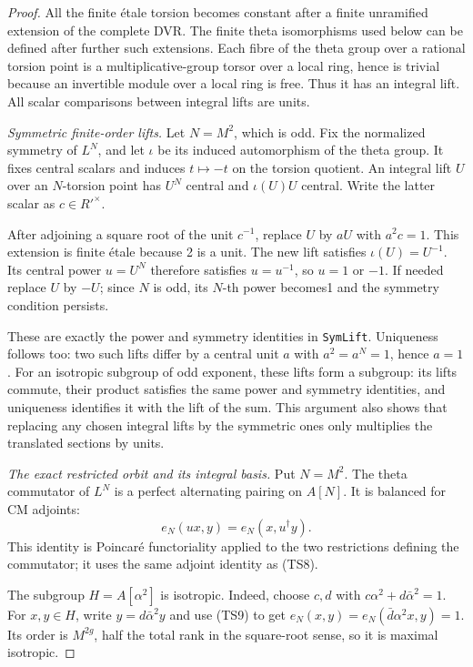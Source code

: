 \documentclass[11pt,a4paper]{article}
\theoremstyle{definition}\newtheorem{remark}[theorem]{Remark}
\begin{document}
\begin{proof}
All the finite étale torsion becomes constant after a finite unramified extension of the complete DVR. The finite theta isomorphisms used below can be defined after further such extensions. Each fibre of the theta group over a rational torsion point is a multiplicative-group torsor over a local ring, hence is trivial because an invertible module over a local ring is free. Thus it has an integral lift. All scalar comparisons between integral lifts are units.

\emph{Symmetric finite-order lifts.}
Let \(N=M^2\), which is odd. Fix the normalized symmetry of \(L^N\), and let \(\iota\) be its induced automorphism of the theta group. It fixes central scalars and induces \(t\mapsto-t\) on the torsion quotient. An integral lift \(U\) over an \(N\)-torsion point has \(U^N\) central and \(\iota(U)U\) central. Write the latter scalar as \(c\in R'^\times\).

After adjoining a square root of the unit \(c^{-1}\), replace \(U\) by \(aU\) with \(a^2c=1\). This extension is finite étale because 2 is a unit. The new lift satisfies \(\iota(U)=U^{-1}\). Its central power \(u=U^N\) therefore satisfies \(u=u^{-1}\), so \(u=1\) or \(-1\). If needed replace \(U\) by \(-U\); since \(N\) is odd, its \(N\)-th power becomes1 and the symmetry condition persists.

These are exactly the power and symmetry identities in \texttt{SymLift}. Uniqueness follows too: two such lifts differ by a central unit \(a\) with \(a^2=a^N=1\), hence \(a=1\). For an isotropic subgroup of odd exponent, these lifts form a subgroup: its lifts commute, their product satisfies the same power and symmetry identities, and uniqueness identifies it with the lift of the sum. This argument also shows that replacing any chosen integral lifts by the symmetric ones only multiplies the translated sections by units.

\emph{The exact restricted orbit and its integral basis.}
Put \(N=M^2\). The theta commutator of \(L^N\) is a perfect alternating pairing on \(A[N]\). It is balanced for CM adjoints: \[
 e_N(u x,y)=e_N(x,u^\dagger y).
 \tag{TS9}
\] This identity is Poincaré functoriality applied to the two restrictions defining the commutator; it uses the same adjoint identity as (TS8).

The subgroup \(H=A[\alpha^2]\) is isotropic. Indeed, choose \(c,d\) with \(c\alpha^2+d\bar\alpha^2=1\). For \(x,y\in H\), write \(y=d\bar\alpha^2y\) and use (TS9) to get \(e_N(x,y)=e_N(\bar d\alpha^2x,y)=1\). Its order is \(M^{2g}\), half the total rank in the square-root sense, so it is maximal isotropic.


\end{proof}
\end{document}
